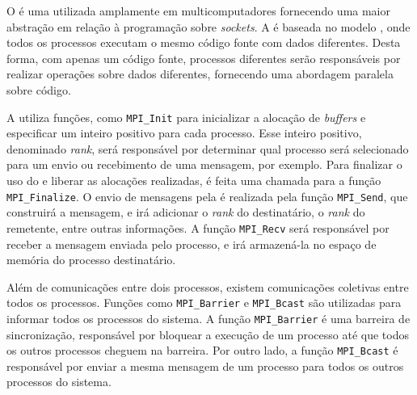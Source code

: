 O \mpi é uma \api utilizada amplamente em multicomputadores fornecendo uma maior
abstração em relação à programação sobre \textit{sockets}. A \api é baseada no
modelo \spmd, onde todos os processos executam o mesmo código fonte com
dados diferentes. Desta forma, com apenas um código fonte, processos diferentes
serão responsáveis por realizar operações sobre dados diferentes, fornecendo uma abordagem
paralela sobre código.

A \api utiliza funções, como \texttt{MPI\_Init} para inicializar a alocação de
\textit{buffers} e  especificar um inteiro positivo para cada processo. Esse
inteiro positivo, denominado \textit{rank}, será responsável por determinar qual
processo será selecionado para um envio ou recebimento de uma mensagem, por
exemplo. Para finalizar o uso do \mpi e liberar as alocações realizadas, é feita
uma chamada para a função \texttt{MPI\_Finalize}. O envio de mensagens pela \api
é realizada pela função \texttt{MPI\_Send}, que construirá a mensagem, e irá
adicionar o \textit{rank} do destinatário, o \textit{rank} do remetente, entre
outras informações. A função \texttt{MPI\_Recv} será responsável por receber a
mensagem enviada pelo processo, e irá armazená-la no espaço de memória
do processo destinatário.

Além de comunicações entre dois processos, existem comunicações coletivas entre
todos os processos. Funções como \texttt{MPI\_Barrier} e \texttt{MPI\_Bcast} são
utilizadas para informar todos os processos do sistema. A função
\texttt{MPI\_Barrier} é uma barreira de sincronização, responsável por bloquear a
execução de um processo até que todos os outros processos cheguem na barreira.
Por outro lado, a função \texttt{MPI\_Bcast} é responsável por enviar a mesma
mensagem de um processo para todos os outros processos do sistema.

